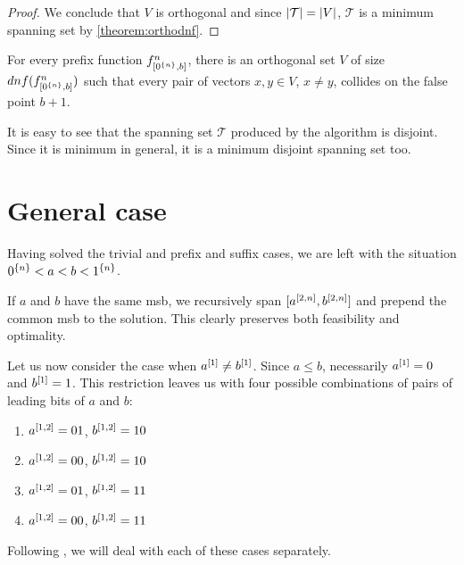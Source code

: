 \begin{proof}

We conclude that $V$ is orthogonal
and since $\lvert\mathcal{T}\rvert = \lvert V\rvert$,
$\mathcal{T}$ is a minimum spanning set
by \autoref{theorem:orthodnf}.
\end{proof}

\begin{corollary}
\label{corollary:prefixdependence}
For every prefix function $f^{n}_{[0^{\{n\}}, b]}$,
there is an orthogonal set $V$
of size $dnf(f^{n}_{[0^{\{n\}}, b]})$
such that
every pair of vectors $x,y \in V$, $x \neq y$,
collides on the false point $b+1$.
\end{corollary}

It is easy to see that the spanning set $\mathcal{T}$
produced by the algorithm is disjoint.
Since it is minimum in general,
it is a minimum disjoint spanning set too.

\section{General case}

Having solved the trivial and prefix and suffix cases,
we are left with the situation
$0^{\{n\}} < a < b < 1^{\{n\}}$.

If $a$ and $b$ have the same \acrshort{msb},
we recursively span
$[a^{[2, n]}, b^{[2, n]}]$
and prepend the common \acrshort{msb}
to the solution.
This clearly preserves both feasibility and optimality.

Let us now consider the case when
$a^{[1]} \neq b^{[1]}$.
Since $a \leq b$,
necessarily $a^{[1]} = 0$
and $b^{[1]} = 1$.
This restriction leaves us with
four possible combinations of pairs
of leading bits of $a$ and $b$:

\begin{enumerate}
\item $a^{[1, 2]} = 01$, $b^{[1, 2]} = 10$
\item $a^{[1, 2]} = 00$, $b^{[1, 2]} = 10$
\item $a^{[1, 2]} = 01$, $b^{[1, 2]} = 11$
\item $a^{[1, 2]} = 00$, $b^{[1, 2]} = 11$
\end{enumerate}

Following \citet{Schieber2005154},
we will deal with each of these cases separately.

